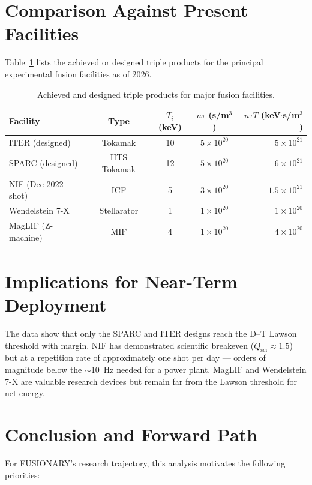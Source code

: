 \documentclass[11pt]{article}
\begin{document}
\section{Comparison Against Present Facilities}

Table~\ref{tab:facilities} lists the achieved or designed triple products
for the principal experimental fusion facilities as of 2026.

\begin{table}[h]
\centering
\begin{tabular}{lcccr}
\hline
Facility & Type & $T_i$ (keV) & $n \tau$ (s/m$^3$) & $n\tau T$ (keV$\cdot$s/m$^3$) \\
\hline
ITER (designed)        & Tokamak      & 10  & $5 \times 10^{20}$ & $5 \times 10^{21}$ \\
SPARC (designed)       & HTS Tokamak  & 12  & $5 \times 10^{20}$ & $6 \times 10^{21}$ \\
NIF (Dec 2022 shot)    & ICF          & 5   & $3 \times 10^{20}$ & $1.5 \times 10^{21}$ \\
Wendelstein 7-X        & Stellarator  & 1   & $1 \times 10^{20}$ & $1 \times 10^{20}$ \\
MagLIF (Z-machine)     & MIF          & 4   & $1 \times 10^{20}$ & $4 \times 10^{20}$ \\
\hline
\end{tabular}
\caption{Achieved and designed triple products for major fusion facilities.}
\label{tab:facilities}
\end{table}

\section{Implications for Near-Term Deployment}

The data show that only the SPARC and ITER designs reach the D--T Lawson
threshold with margin. NIF has demonstrated scientific breakeven
($Q_\text{sci} \approx 1.5$) but at a repetition rate of approximately one
shot per day --- orders of magnitude below the $\sim$10~Hz needed for a
power plant. MagLIF and Wendelstein 7-X are valuable research devices but
remain far from the Lawson threshold for net energy.

\section{Conclusion and Forward Path}

For FUSIONARY's research trajectory, this analysis motivates the following
priorities:
\end{document}
